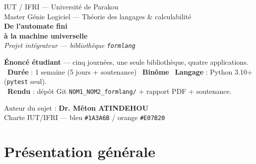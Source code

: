 \documentclass[11pt,a4paper]{scrartcl}
\begin{document}
\begin{titlepage}
\thispagestyle{empty}
\begin{tcolorbox}[enhanced,colback=iutblue,colframe=iutblue,sharp corners,
   coltext=white,height=6cm,valign=center,left=14pt,right=14pt]
  {\small IUT / IFRI — Université de Parakou}\\[2pt]
  {\small Master Génie Logiciel — Théorie des langages \& calculabilité}\\[14pt]
  {\Huge\bfseries De l'automate fini\\[4pt] à la machine universelle}\\[10pt]
  {\large\itshape Projet intégrateur — bibliothèque \texttt{formlang}}
\end{tcolorbox}

\vspace{10mm}
\begin{tcolorbox}[enhanced,colback=iutorange!8,colframe=iutorange,left=10pt,right=10pt]
\textbf{Énoncé étudiant} — cinq journées, une seule bibliothèque, quatre applications.\\[4pt]
\textbullet\ \textbf{Durée} : 1 semaine (5 jours + soutenance) \quad\textbullet\ \textbf{Binôme}
\quad\textbullet\ \textbf{Langage} : Python 3.10+ (\texttt{pytest} seul).\\[2pt]
\textbullet\ \textbf{Rendu} : dépôt Git \texttt{NOM1\_NOM2\_formlang/} + rapport PDF + soutenance.
\end{tcolorbox}

\vfill
\begin{center}
{\small Auteur du sujet : \textbf{Dr. Mêton ATINDEHOU}}\\[2pt]
{\footnotesize\color{iutgrey} Charte IUT/IFRI — bleu \texttt{\#1A3A6B} / orange \texttt{\#E07B20}}
\end{center}
\end{titlepage}

\renewcommand{\cftsecfont}{\color{iutblue}\bfseries}
\tableofcontents
\clearpage

\section{Présentation générale}
\end{document}

